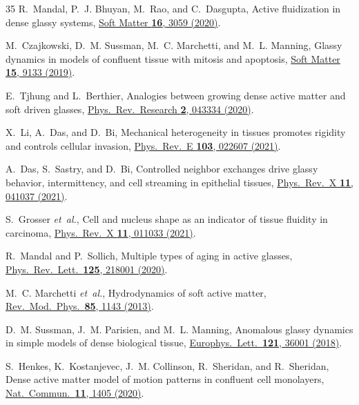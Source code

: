 \documentclass[aps,pre,twocolumn,superscriptaddress,longbibliography,floatfix]{revtex4-2}
\begin{document}
\begin{thebibliography}{35}
R.~Mandal, P.~J. Bhuyan, M.~Rao, and C.~Dasgupta,
Active fluidization in dense glassy systems,
\href{https://doi.org/10.1039/C9SM01873E}{Soft Matter \textbf{16}, 3059 (2020)}.

M.~Czajkowski, D.~M. Sussman, M.~C. Marchetti, and M.~L. Manning,
Glassy dynamics in models of confluent tissue with mitosis and
apoptosis,
\href{https://doi.org/10.1039/c9sm00916g}{Soft Matter \textbf{15}, 9133 (2019)}.

E.~Tjhung and L.~Berthier,
Analogies between growing dense active matter and soft driven glasses,
\href{https://doi.org/10.1103/PhysRevResearch.2.043334}{Phys.\ Rev.\ Research \textbf{2}, 043334 (2020)}.

X.~Li, A.~Das, and D.~Bi,
Mechanical heterogeneity in tissues promotes rigidity and controls
cellular invasion,
\href{https://doi.org/10.1103/PhysRevE.103.022607}{Phys.\ Rev.\ E \textbf{103}, 022607 (2021)}.

A.~Das, S.~Sastry, and D.~Bi,
Controlled neighbor exchanges drive glassy behavior, intermittency, and
cell streaming in epithelial tissues,
\href{https://doi.org/10.1103/PhysRevX.11.041037}{Phys.\ Rev.\ X \textbf{11}, 041037 (2021)}.

S.~Grosser \textit{et~al.},
Cell and nucleus shape as an indicator of tissue fluidity in carcinoma,
\href{https://doi.org/10.1103/PhysRevX.11.011033}{Phys.\ Rev.\ X \textbf{11}, 011033 (2021)}.

R.~Mandal and P.~Sollich,
Multiple types of aging in active glasses,
\href{https://doi.org/10.1103/PhysRevLett.125.218001}{Phys.\ Rev.\ Lett.\ \textbf{125}, 218001 (2020)}.

M.~C. Marchetti \textit{et~al.},
Hydrodynamics of soft active matter,
\href{https://doi.org/10.1103/RevModPhys.85.1143}{Rev.\ Mod.\ Phys.\ \textbf{85}, 1143 (2013)}.

D.~M. Sussman, J.~M. Parisien, and M.~L. Manning,
Anomalous glassy dynamics in simple models of dense biological tissue,
\href{https://doi.org/10.1209/0295-5075/121/36001}{Europhys.\ Lett.\ \textbf{121}, 36001 (2018)}.

S.~Henkes, K.~Kostanjevec, J.~M. Collinson, R.~Sheridan,
and R.~Sheridan,
Dense active matter model of motion patterns in confluent cell
monolayers,
\href{https://doi.org/10.1038/s41467-020-15078-0}{Nat.\ Commun.\ \textbf{11}, 1405 (2020)}.

\end{thebibliography}
\end{document}
